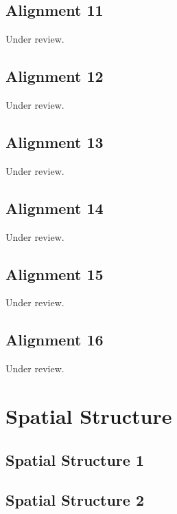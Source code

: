 \documentclass{scrartcl}
\begin{document}
\subsection{Alignment 11}
\label{sec:align_11}
Under review.%
\clearpage

\subsection{Alignment 12}
\label{sec:align_12}
Under review.%
\clearpage

\subsection{Alignment 13}
\label{sec:align_13}
Under review.%
\clearpage

\subsection{Alignment 14}
\label{sec:align_14}
Under review.%
\clearpage

\subsection{Alignment 15}
\label{sec:align_15}
Under review.%
\clearpage

\subsection{Alignment 16}
\label{sec:align_16}
Under review.%
\clearpage

\section{Spatial Structure}

\subsection{Spatial Structure 1}
\label{sec:spatial_1}
\clearpage

\subsection{Spatial Structure 2}
\label{sec:spatial_2}
\clearpage
\end{document}
